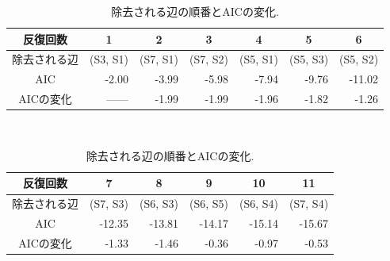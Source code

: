 \documentclass[11pt,dvipdfmx]{jarticle}
\theoremstyle{definition}
\begin{document}
\begin{table}[htbp]
	\caption{除去される辺の順番とAICの変化. }
	\label{table:aic}
	\begin{center}{\small
			\begin{tabular}{|c|rrrrrr|}
                \hline
                反復回数   & \multicolumn{1}{c}{1} & \multicolumn{1}{c}{2} & \multicolumn{1}{c}{3} & \multicolumn{1}{c}{4} & \multicolumn{1}{c}{5} & \multicolumn{1}{c|}{6}  \\ \hline
                除去される辺 & (S3, S1)              & (S7, S1)              & (S7, S2)              & (S5, S1)              & (S5, S3)              & (S5, S2)               \\
                AIC    & -2.00                 & -3.99                 & -5.98                 & -7.94                 & -9.76                 & -11.02                 \\
                AICの変化 & ------ & -1.99 & -1.99 & -1.96 & -1.82 & -1.26 \\ \hline
            \end{tabular}
            \\ \vspace{3mm}
            \begin{tabular}{|c|rrrrr|}
                \hline
                反復回数   & \multicolumn{1}{c}{7} & \multicolumn{1}{c}{8} & \multicolumn{1}{c}{9} & \multicolumn{1}{c}{10} & \multicolumn{1}{c|}{11} \\ \hline
                除去される辺 & (S7, S3)              & (S6, S3)              & (S6, S5)              & (S6, S4)               & (S7, S4)                        \\
                AIC    & -12.35                & -13.81                & -14.17                & -15.14                 & -15.67              \\ 
                AICの変化 & -1.33 & -1.46 & -0.36 & -0.97 & -0.53 \\ \hline
        \end{tabular}}
	\end{center}
\end{table}
\end{document}
